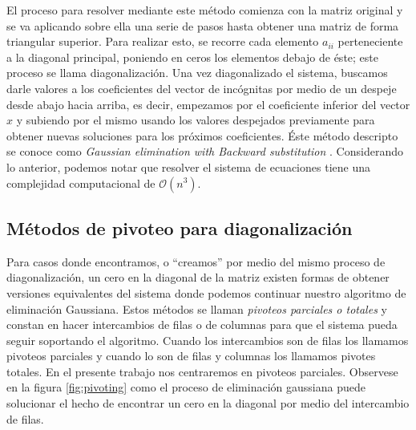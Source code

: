 El proceso para resolver mediante este método comienza con la matriz original y se va aplicando sobre ella una serie de pasos hasta obtener una matriz de forma triangular superior. Para realizar esto, se recorre cada elemento $a_{ii}$ perteneciente a la diagonal principal, poniendo en ceros los elementos debajo de éste; este proceso se llama diagonalización. Una vez diagonalizado el sistema, buscamos darle valores a los coeficientes del vector de incógnitas por medio de un despeje desde abajo hacia arriba, es decir, empezamos por el coeficiente inferior del vector $x$ y subiendo por el mismo usando los valores despejados previamente para obtener nuevas soluciones para los próximos coeficientes. Éste  método descripto se conoce como \textit{Gaussian elimination with Backward substitution} \cite{Burden11}.
Considerando lo anterior, podemos notar que resolver el sistema de ecuaciones tiene una complejidad computacional de $\mathcal{O}(n^3)$.

\subsection{Métodos de pivoteo para diagonalización}

Para casos donde encontramos, o  ``creamos'' por medio del mismo proceso de diagonalización, un cero en la diagonal de la matriz existen formas de obtener versiones equivalentes del sistema donde podemos continuar nuestro algoritmo de eliminación Gaussiana. Estos métodos se llaman \textit{pivoteos parciales o totales} y constan en hacer intercambios de filas o de columnas para que el sistema pueda seguir soportando el algoritmo. Cuando los intercambios son de filas los llamamos pivoteos parciales y cuando lo son de filas y columnas los llamamos pivotes totales. En el presente trabajo nos centraremos en pivoteos parciales. Observese en la figura \ref{fig:pivoting} como el proceso de eliminación gaussiana puede solucionar el hecho de encontrar un cero en la diagonal por medio del intercambio de filas.

